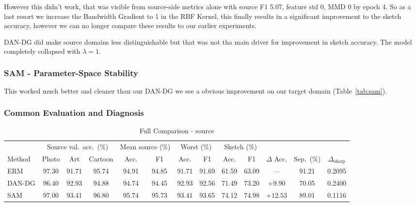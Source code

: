 \documentclass{article}
\begin{document}
However this didn't work, that was visible from source-side metrics alone with source F1 5.07, feature std 0, MMD 0 by epoch 4. So as a last resort we increase the Bandwidth Gradient to 1 in the RBF Kernel,
this finally results in a significant improvement to the sketch accuracy, however we can no longer
compare these results to our earlier experiments.


DAN-DG did make source domains less distinguishable but that was not tha main driver for improvement in sketch accuracy. The model completely collapsed with $\lambda = 1$.

\subsubsection{SAM - Parameter-Space Stability}




This worked much better and cleaner than our DAN-DG we see a obvious improvement on our target domain (Table~\ref{tab:sam}).

\subsubsection{Common Evaluation and Diagnosis}

\begin{table}[tb]
  \caption{Full Comparison - source}
  \label{tab:t3-common}
  \centering
  \footnotesize
  \setlength{\tabcolsep}{3pt}
  \begin{tabular}{lcccccccccccc}
    \toprule
    & \multicolumn{3}{c}{Source val.\ acc.\ (\%)} & \multicolumn{2}{c}{Mean source (\%)} & \multicolumn{2}{c}{Worst (\%)} & \multicolumn{2}{c}{Sketch (\%)} & & & \\
    \cmidrule(lr){2-4} \cmidrule(lr){5-6} \cmidrule(lr){7-8} \cmidrule(lr){9-10}
    Method & Photo & Art & Cartoon & Acc. & F1 & Acc. & F1 & Acc. & F1 & $\Delta$ Acc. & Sep.\ (\%) & $\Delta_{\mathrm{sharp}}$ \\
    \midrule
    ERM    & 97.30 & 91.71 & 95.74 & 94.91 & 94.85 & 91.71 & 91.69 & 61.59 & 63.09 & ---      & 91.21 & 0.2095 \\
    DAN-DG & 96.40 & 92.93 & 94.88 & 94.74 & 94.45 & 92.93 & 92.56 & 71.49 & 73.20 & $+9.90$  & 70.05 & 0.2400 \\
    SAM    & 97.00 & 93.41 & 96.80 & 95.74 & 95.73 & 93.41 & 93.65 & 74.12 & 74.98 & $+12.53$ & 89.01 & 0.1116 \\
    \bottomrule
  \end{tabular}
\end{table}
\end{document}
